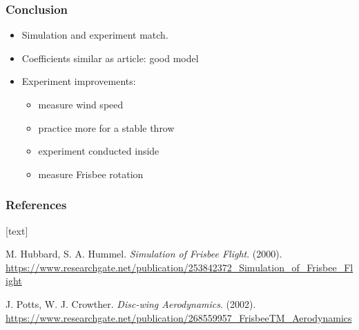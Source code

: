 \documentclass{beamer}
\begin{document}
\begin{frame}

\frametitle{Conclusion}

\begin{itemize}
\item Simulation and experiment match.
\item Coefficients similar as article: good model
\item Experiment improvements:

\begin{itemize}
\item measure wind speed 
\item practice more for a stable throw
\item experiment conducted inside
\item measure Frisbee rotation
\end{itemize}

\end{itemize}

\end{frame}


\begin{frame}

\frametitle{References}

[text]

\begin{thebibliography}{9}

M. Hubbard, S. A. Hummel. \textit{Simulation of Frisbee Flight}. (2000). \url{https://www.researchgate.net/publication/253842372_Simulation_of_Frisbee_Flight}

J. Potts, W. J. Crowther. \textit{Disc-wing Aerodynamics}. (2002). \url{https://www.researchgate.net/publication/268559957_FrisbeeTM_Aerodynamics}

\end{thebibliography}

\end{frame}

\end{document}
